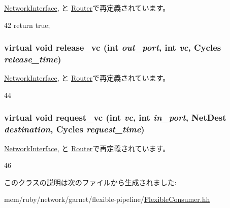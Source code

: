 \hyperlink{classNetworkInterface_af3465adbf20f8764ea878ce2d28d2bc8}{NetworkInterface}, と \hyperlink{classRouter_af3465adbf20f8764ea878ce2d28d2bc8}{Router}で再定義されています。


\begin{DoxyCode}
42 { return true; }
\end{DoxyCode}
\hypertarget{classFlexibleConsumer_a54d4f8948ced53110ed96024a64adf7e}{
\subsubsection[{release\_\-vc}]{\setlength{\rightskip}{0pt plus 5cm}virtual void release\_\-vc (int {\em out\_\-port}, \/  int {\em vc}, \/  {\bf Cycles} {\em release\_\-time})}}
\label{classFlexibleConsumer_a54d4f8948ced53110ed96024a64adf7e}


\hyperlink{classNetworkInterface_adced7fd7d25eb0d6a869fff14085e8c3}{NetworkInterface}, と \hyperlink{classRouter_adced7fd7d25eb0d6a869fff14085e8c3}{Router}で再定義されています。


\begin{DoxyCode}
44 {}
\end{DoxyCode}
\hypertarget{classFlexibleConsumer_aa0ffe58ceb5a05129736d59f3eeabcf0}{
\subsubsection[{request\_\-vc}]{\setlength{\rightskip}{0pt plus 5cm}virtual void request\_\-vc (int {\em vc}, \/  int {\em in\_\-port}, \/  {\bf NetDest} {\em destination}, \/  {\bf Cycles} {\em request\_\-time})}}
\label{classFlexibleConsumer_aa0ffe58ceb5a05129736d59f3eeabcf0}


\hyperlink{classNetworkInterface_ac2db714adfe0dfd2c3ac2b88bd6a5308}{NetworkInterface}, と \hyperlink{classRouter_ac2db714adfe0dfd2c3ac2b88bd6a5308}{Router}で再定義されています。


\begin{DoxyCode}
46                                                  {}
\end{DoxyCode}


このクラスの説明は次のファイルから生成されました:\begin{DoxyCompactItemize}
\item 
mem/ruby/network/garnet/flexible-\/pipeline/\hyperlink{FlexibleConsumer_8hh}{FlexibleConsumer.hh}\end{DoxyCompactItemize}
